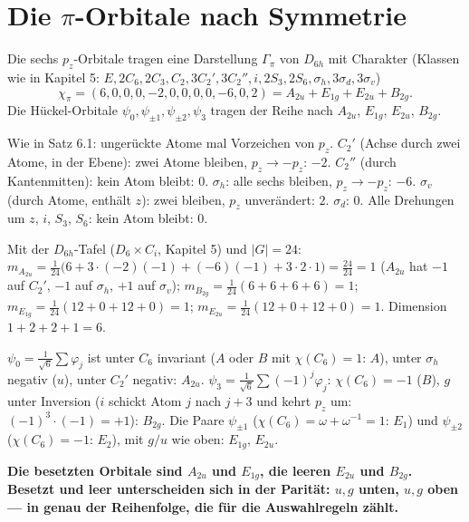 \section{Die $\pi$-Orbitale nach Symmetrie}

\begin{merksatz}
Die sechs $p_z$-Orbitale tragen eine Darstellung $\Gamma_\pi$ von $D_{6h}$ mit Charakter (Klassen wie in Kapitel 5: $E, 2C_6, 2C_3, C_2, 3C_2', 3C_2'', i, 2S_3, 2S_6, \sigma_h, 3\sigma_d, 3\sigma_v$)
\[ \chi_\pi = (6, 0, 0, 0, -2, 0, 0, 0, 0, -6, 0, 2) = A_{2u} + E_{1g} + E_{2u} + B_{2g} . \]
Die Hückel-Orbitale $\psi_0, \psi_{\pm1}, \psi_{\pm2}, \psi_3$ tragen der Reihe nach $A_{2u}$, $E_{1g}$, $E_{2u}$, $B_{2g}$.

Wie in Satz 6.1: ungerückte Atome mal Vorzeichen von $p_z$. $C_2'$ (Achse durch zwei Atome, in der Ebene): zwei Atome bleiben, $p_z\to-p_z$: $-2$. $C_2''$ (durch Kantenmitten): kein Atom bleibt: $0$. $\sigma_h$: alle sechs bleiben, $p_z\to-p_z$: $-6$. $\sigma_v$ (durch Atome, enthält $z$): zwei bleiben, $p_z$ unverändert: $2$. $\sigma_d$: $0$. Alle Drehungen um $z$, $i$, $S_3$, $S_6$: kein Atom bleibt: $0$.

Mit der $D_{6h}$-Tafel ($D_6\times C_i$, Kapitel 5) und $|G| = 24$: $m_{A_{2u}} = \frac1{24}\bigl(6 + 3\cdot(-2)(-1) + (-6)(-1) + 3\cdot2\cdot1\bigr) = \frac{24}{24} = 1$ ($A_{2u}$ hat $-1$ auf $C_2'$, $-1$ auf $\sigma_h$, $+1$ auf $\sigma_v$); $m_{B_{2g}} = \frac1{24}(6 + 6 + 6 + 6) = 1$; $m_{E_{1g}} = \frac1{24}(12 + 0 + 12 + 0) = 1$; $m_{E_{2u}} = \frac1{24}(12 + 0 + 12 + 0) = 1$. Dimension $1 + 2 + 2 + 1 = 6$. \checkmark

$\psi_0 = \frac1{\sqrt6}\sum\varphi_j$ ist unter $C_6$ invariant ($A$ oder $B$ mit $\chi(C_6) = 1$: $A$), unter $\sigma_h$ negativ ($u$), unter $C_2'$ negativ: $A_{2u}$. $\psi_3 = \frac1{\sqrt6}\sum(-1)^{j}\varphi_j$: $\chi(C_6) = -1$ ($B$), $g$ unter Inversion ($i$ schickt Atom $j$ nach $j + 3$ und kehrt $p_z$ um: $(-1)^{3}\cdot(-1) = +1$): $B_{2g}$. Die Paare $\psi_{\pm1}$ ($\chi(C_6) = \omega + \omega^{-1} = 1$: $E_1$) und $\psi_{\pm2}$ ($\chi(C_6) = -1$: $E_2$), mit $g/u$ wie oben: $E_{1g}$, $E_{2u}$.

\begin{center}
\begin{minipage}{0.9\textwidth}
\textbf{Die besetzten Orbitale sind $A_{2u}$ und $E_{1g}$, die leeren $E_{2u}$ und $B_{2g}$. Besetzt und leer unterscheiden sich in der Parität: $u, g$ unten, $u, g$ oben --- in genau der Reihenfolge, die für die Auswahlregeln zählt.}
\end{minipage}
\end{center}


\end{merksatz}
